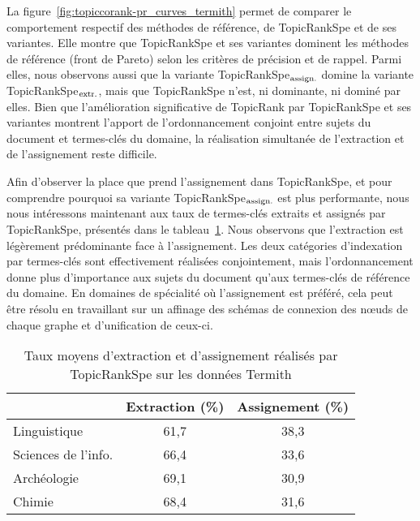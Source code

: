   La figure~\ref{fig:topiccorank-pr_curves_termith} permet de comparer le
  comportement respectif des méthodes de référence, de TopicRankSpe et de
  ses variantes. Elle montre que TopicRankSpe et ses variantes dominent les
  méthodes de référence (front de Pareto) selon les critères de précision
  et de rappel. Parmi elles, nous observons aussi que la variante
  TopicRankSpe$_\textnormal{assign.}$ domine la variante
  TopicRankSpe$_\textnormal{extr.}$, mais que TopicRankSpe n'est, ni
  dominante, ni dominé par elles. Bien que l'amélioration significative de
  TopicRank par TopicRankSpe et ses variantes montrent l'apport de
  l'ordonnancement conjoint entre sujets du document et termes-clés du
  domaine, la réalisation simultanée de l'extraction et de l'assignement
  reste difficile.
  

  Afin d'observer la place que prend l'assignement dans TopicRankSpe, et
  pour comprendre pourquoi sa variante TopicRankSpe$_\textnormal{assign.}$
  est plus performante, nous nous intéressons maintenant aux taux de
  termes-clés extraits et assignés par TopicRankSpe, présentés dans le
  tableau~\ref{tab:assignment_ratio_termith}. Nous observons que
  l'extraction est légèrement prédominante face à \mbox{l'assignement}. Les deux
  catégories d'indexation par termes-clés sont effectivement réalisées
  conjointement, mais l'ordonnancement donne plus d'importance aux sujets
  du document qu'aux termes-clés de référence du domaine. En domaines de
  spécialité où l'assignement est préféré, cela peut être résolu en
  travaillant sur un affinage des schémas de connexion des n\oe{}uds de
  chaque graphe et d'unification de ceux-ci.
  \begin{table}
    \centering
    \begin{tabular}{l|c|c}
        \toprule
        & Extraction (\%) & Assignement (\%)\\
        \hline
        Linguistique & 61,7 & 38,3\\
        Sciences de l'info. & 66,4 & 33,6\\
        Archéologie & 69,1 & 30,9\\
        Chimie & 68,4 & 31,6\\
        \bottomrule
    \end{tabular}
    \caption{Taux moyens d'extraction et d'assignement réalisés par
             TopicRankSpe sur les données Termith
             \label{tab:assignment_ratio_termith}}
  \end{table}

